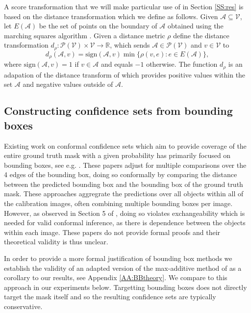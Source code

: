 A score transformation that we will make particular use of in Section \ref{SS:res} is based on the distance transformation which we define as follows. Given $\mathcal{A} \subseteq \mathcal{V}$, let $E(\mathcal{A})$ be the set of points on the boundary of $\mathcal{A}$ obtained using the marching squares algorithm \citep{Maple2003}. Given a distance metric $\rho$ define the distance transformation $d_{\rho}: \mathcal{P}(\mathcal{V}) \times \mathcal{V}\rightarrow \mathbb{R}$, which sends $\mathcal{A} \in \mathcal{P}(\mathcal{V})$ and $v\in \mathcal{V}$ to
\begin{equation*}
	d_{\rho}(\mathcal{A}, v) = \text{sign}(\mathcal{A}, v)\min\lbrace \rho(v, e): e \in E(\mathcal{A})\rbrace, 
\end{equation*}
where $ \text{sign}(\mathcal{A}, v) = 1 $ if $v\in \mathcal{A}$ and equals $-1$ otherwise. The function $d_{\rho}$ is an adapation of the distance transform of \cite{Borgefors1986} which provides positive values within the set $\mathcal{A}$ and negative values outside of $\mathcal{A}$.

\subsection{Constructing confidence sets from bounding boxes}
Existing work on conformal confidence sets which aim to provide coverage of the entire ground truth mask with a given probability has primarily focused on bounding boxes, see e.g. \citep{De2022, Andeol2023, Mukama2024}. These papers adjust for multiple comparisons over the 4 edges of the bounding box, doing so conformally by comparing the distance between the predicted bounding box and the bounding box of the ground truth mask. These approaches aggregrate the predictions over all objects within all of the calibration images, often combining multiple bounding boxes per image. However, as observed in Section 5 of \cite{De2022}, doing so violates exchangeability which is needed for valid conformal inference, as there is dependence between the objects within each image. These papers do not provide formal proofs and their theoretical validity is thus unclear.

In order to provide a more formal justification of bounding box methods we establish the validity of an adapted version of the max-additive method of \cite{Andeol2023} as a corollary to our results, see Appendix \ref{AA:BBtheory}. We compare to this approach in our experiments below. Targetting bounding boxes does not directly target the mask itself and so the resulting confidence sets are typically conservative.

